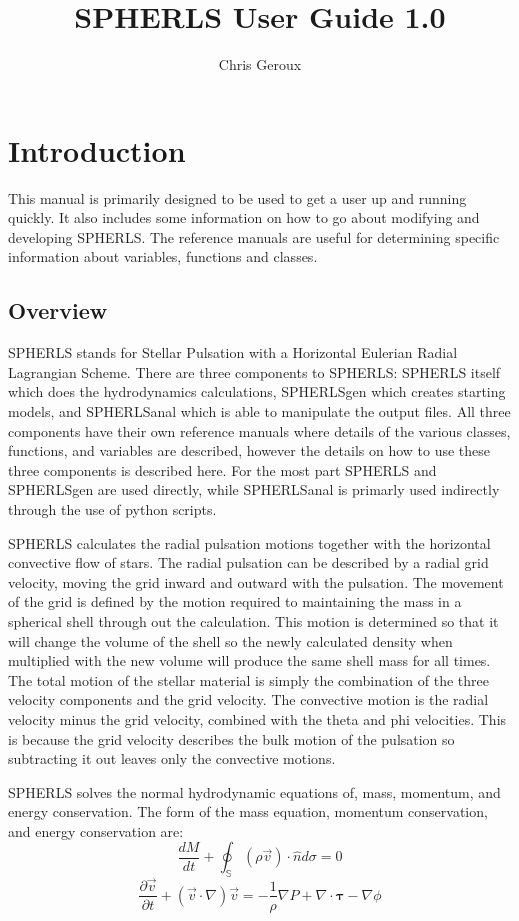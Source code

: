 \documentclass[12pt,a4paper]{book}
\title{SPHERLS User Guide 1.0}
\author{Chris Geroux}
\begin{document}
\maketitle
\chapter{Introduction}
\label{chap:introduction}
This manual is primarily designed to be used to get a user up and running quickly. It also includes some information on how to go about modifying and developing SPHERLS. The reference manuals are useful for determining specific information about variables, functions and classes.

\section{Overview}
\label{sec:overview}
SPHERLS stands for Stellar Pulsation with a Horizontal Eulerian Radial Lagrangian Scheme. There are three components to SPHERLS: SPHERLS itself which does the hydrodynamics calculations, SPHERLSgen which creates starting models, and SPHERLSanal which is able to manipulate the output files. All three components have their own reference manuals where details of the various classes, functions, and variables are described, however the details on how to use these three components is described here. For the most part SPHERLS and SPHERLSgen are used directly, while SPHERLSanal is primarly used indirectly through the use of python scripts.
  
SPHERLS calculates the radial pulsation motions together with the horizontal convective flow of stars. The radial pulsation can be described by a radial grid velocity, moving the grid inward and outward with the pulsation. The movement of the grid is defined by the motion required to maintaining the mass in a spherical shell through out the calculation. This motion is determined so that it will change the volume of the shell so the newly calculated density when multiplied with the new volume will produce the same shell mass for all times. The total motion of the stellar material is simply the combination of the three velocity components and the grid velocity.  The convective motion is the radial velocity minus the grid velocity, combined with the theta and phi velocities. This is because the grid velocity describes the bulk motion of the pulsation so subtracting it out leaves only the convective motions.

SPHERLS solves the normal hydrodynamic equations of, mass, momentum, and energy conservation. The form of the mass equation, momentum conservation, and energy conservation are:
\begin{equation}
\frac{d M}{d t} + \oint_{\mathbb{S}} \left(\rho\vec v\right)\cdot\hat{n}d\sigma=0
\end{equation}
\begin{equation}
\frac{\partial \vec{v}}{\partial t}+(\vec{v}\cdot\nabla)\vec{v}=-\frac{1}{\rho}\nabla P + \nabla\cdot\mathbf{\tau}-\nabla \phi
\end{equation}
  
\end{document}
